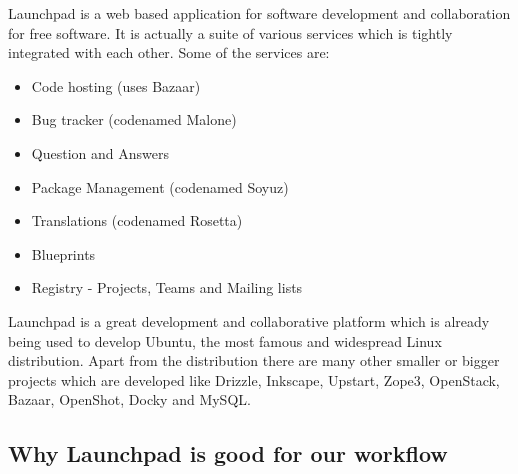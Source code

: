 Launchpad is a web based application for software development and collaboration for 
free software. It is actually a suite of various services which is tightly integrated 
with each other. Some of the services are:
\begin{itemize}
\item Code hosting (uses Bazaar)
\item Bug tracker (codenamed Malone)
\item Question and Answers
\item Package Management (codenamed Soyuz)
\item Translations (codenamed Rosetta)
\item Blueprints
\item Registry - Projects, Teams and Mailing lists
\end{itemize}

Launchpad is a great development and collaborative platform which is already being used 
to develop Ubuntu, the most famous and widespread Linux distribution. Apart from the 
distribution there are many other smaller or bigger projects which are developed like 
Drizzle, Inkscape, Upstart, Zope3, OpenStack, Bazaar, OpenShot, Docky and MySQL.

\subsection{Why Launchpad is good for our workflow}
